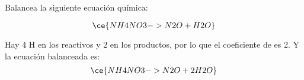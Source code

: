 Balancea la siguiente ecuación química:

\[
    \ce{NH4NO3 -> N2O + H2O }
\]

\begin{solutionbox}{2cm}
    Hay 4 H en los reactivos y 2 en los productos, por lo que el coeficiente de  es 2. Y la ecuación balanceada es:
    \[
        \ce{NH4NO3 -> N2O + 2H2O}
    \]
\end{solutionbox}